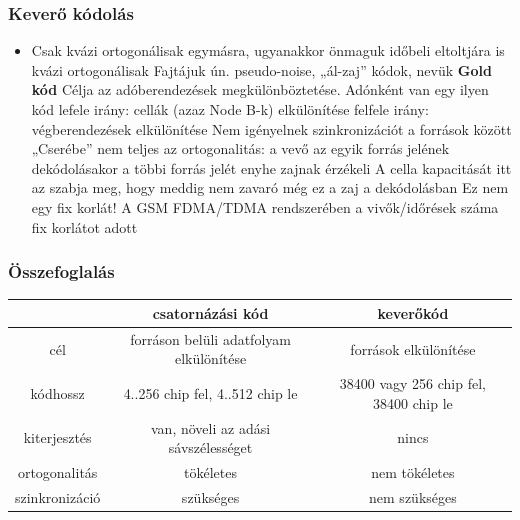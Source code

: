 \documentclass[10pt,a4paper]{article}
\begin{document}
\subsubsection{Keverő kódolás}
\begin{itemize}
	\item Csak kvázi ortogonálisak egymásra, ugyanakkor önmaguk időbeli
	eltoltjára is kvázi ortogonálisak
	\subitem Fajtájuk ún. pseudo-noise, „ál-zaj” kódok, nevük \textbf{Gold kód}
	\subitem Célja az adóberendezések megkülönböztetése. Adónként van egy
	ilyen kód
	\subitem lefele irány: cellák (azaz Node B-k) elkülönítése
	\subitem felfele irány: végberendezések elkülönítése
	\subitem Nem igényelnek szinkronizációt a források között
	\subitem „Cserébe” nem teljes az ortogonalitás: a vevő az egyik forrás jelének
	dekódolásakor a többi forrás jelét enyhe zajnak érzékeli
	\subitem A cella kapacitását itt az szabja meg, hogy meddig nem zavaró még
	ez a zaj a dekódolásban
	\subitem Ez nem egy fix korlát!
	\subitem A GSM FDMA/TDMA rendszerében a vivők/időrések száma fix korlátot
	adott
\end{itemize}
\subsubsection{Összefoglalás}
\begin{tabular}{|c|c|c|}
	\hline 
	& csatornázási kód & keverőkód \\ 
	\hline 
	cél & forráson belüli adatfolyam elkülönítése & források elkülönítése \\ 
	\hline 
	kódhossz & 4..256 chip fel, 4..512 chip le & 38400 vagy 256 chip fel, 38400 chip le \\ 
	\hline 
	kiterjesztés & van, növeli az adási sávszélességet & nincs \\ 
	\hline 
	ortogonalitás & tökéletes & nem tökéletes \\ 
	\hline 
	szinkronizáció & szükséges & nem szükséges \\ 
	\hline 
\end{tabular} 
\end{document}
